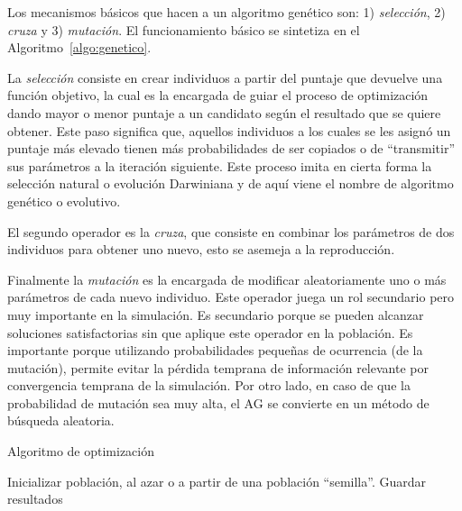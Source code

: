 %
Los mecanismos básicos que hacen a un algoritmo genético son: 1) \emph{selección}, 2)
\emph{cruza} y 3) \emph{mutación}.
%
El funcionamiento básico se sintetiza en el Algoritmo~\ref{algo:genetico}.

La \emph{selección} consiste en crear individuos a partir del puntaje que devuelve
una función objetivo, la cual es la encargada de guiar el proceso de
optimización dando mayor o menor puntaje a un candidato según el resultado que
se quiere obtener.
%
Este paso significa que, aquellos individuos a los cuales se les asignó un
puntaje más elevado tienen más probabilidades de ser copiados o de
``transmitir'' sus parámetros a la iteración siguiente.
%
Este proceso imita en cierta forma la selección natural o evolución Darwiniana y
de aquí viene el nombre de algoritmo genético o evolutivo.

El segundo operador es la \emph{cruza}, que consiste en combinar los parámetros
de dos individuos para obtener uno nuevo, esto se asemeja a la reproducción.

Finalmente la \emph{mutación} es la encargada de modificar aleatoriamente uno o más
parámetros de cada nuevo individuo.
%
Este operador juega un rol secundario pero muy importante en la simulación.
%
Es secundario porque se pueden alcanzar soluciones satisfactorias sin que
aplique este operador en la población.
%
Es importante porque utilizando probabilidades pequeñas de ocurrencia (de la
mutación), permite evitar la pérdida temprana de información relevante por
convergencia temprana de la simulación.
%
Por otro lado, en caso de que la probabilidad de mutación sea muy alta, el AG se
convierte en un método de búsqueda aleatoria.

\begin{algorithm} \caption{Algoritmo de optimización}\label{algo:genetico}
  Inicializar población, al azar o a partir de una población ``semilla''.\;
  {Guardar resultados\;}
\end{algorithm}

